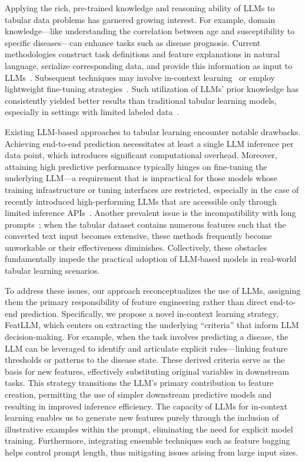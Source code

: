 Applying the rich, pre-trained knowledge and reasoning ability of LLMs to tabular data problems has garnered growing interest. For example, domain knowledge—like understanding the correlation between age and susceptibility to specific diseases—can enhance tasks such as disease prognosis. Current methodologies construct task definitions and feature explanations in natural language, serialize corresponding data, and provide this information as input to LLMs~\cite{dinh2022lift,wang2023anypredict}. Subsequent techniques may involve in-context learning~\cite{nam2023semi} or employ lightweight fine-tuning strategies~\cite{dinh2022lift,hegselmann2023tabllm}. Such utilization of LLMs' prior knowledge has consistently yielded better results than traditional tabular learning models, especially in settings with limited labeled data~\cite{hegselmann2023tabllm}.

Existing LLM-based approaches to tabular learning encounter notable drawbacks. Achieving end-to-end prediction necessitates at least a single LLM inference per data point, which introduces significant computational overhead. Moreover, attaining high predictive performance typically hinges on fine-tuning the underlying LLM—a requirement that is impractical for those models whose training infrastructure or tuning interfaces are restricted, especially in the case of recently introduced high-performing LLMs that are accessible only through limited inference APIs~\cite{anil2023palm,openai2023gpt4}. Another prevalent issue is the incompatibility with long prompts~\cite{liu2023lost}; when the tabular dataset contains numerous features such that the converted text input becomes extensive, these methods frequently become unworkable or their effectiveness diminishes. Collectively, these obstacles fundamentally impede the practical adoption of LLM-based models in real-world tabular learning scenarios.

To address these issues, our approach reconceptualizes the use of LLMs, assigning them the primary responsibility of feature engineering rather than direct end-to-end prediction. Specifically, we propose a novel in-context learning strategy, \textsf{FeatLLM}, which centers on extracting the underlying “criteria” that inform LLM decision-making. For example, when the task involves predicting a disease, the LLM can be leveraged to identify and articulate explicit rules—linking feature thresholds or patterns to the disease state. These derived criteria serve as the basis for new features, effectively substituting original variables in downstream tasks. This strategy transitions the LLM’s primary contribution to feature creation, permitting the use of simpler downstream predictive models and resulting in improved inference efficiency. The capacity of LLMs for in-context learning enables us to generate new features purely through the inclusion of illustrative examples within the prompt, eliminating the need for explicit model training. Furthermore, integrating ensemble techniques such as feature bagging~\cite{breiman2001random} helps control prompt length, thus mitigating issues arising from large input sizes.

